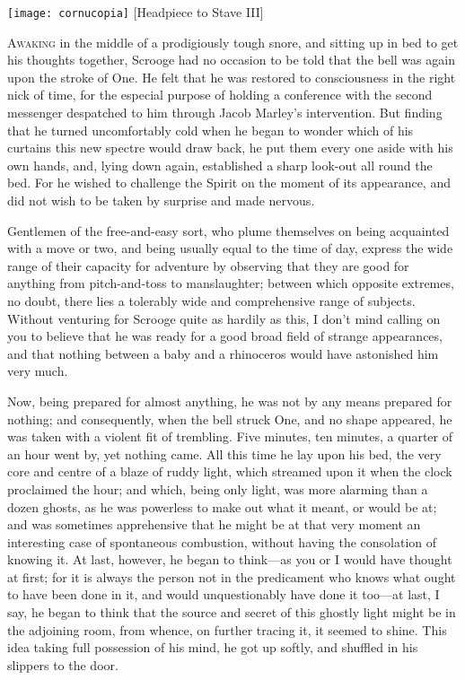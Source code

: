 \begin{minipage}[c]{\textwidth}
\texttt{[image: cornucopia]}
[Headpiece to Stave III]{}
\end{minipage}
\vfill

\lettrine[lines=4]{A}{waking} in the middle of a prodigiously tough snore, and sitting up in bed to get his thoughts together, Scrooge had no occasion to be told that the bell was again upon the stroke of One. He felt that he was restored to consciousness in the right nick of time, for the especial purpose of holding a conference with the second messenger despatched to him through Jacob Marley's intervention. But finding that he turned uncomfortably cold when he began to wonder which of his curtains this new spectre would draw back, he put them every one aside with his own hands, and, lying down again, established a sharp look-out all round the bed. For he wished to challenge the Spirit on the moment of its appearance, and did not wish to be taken by surprise and made nervous.

Gentlemen of the free-and-easy sort, who plume themselves on being acquainted with a move or two, and being usually equal to the time of day, express the wide range of their capacity for adventure by observing that they are good for anything from pitch-and-toss to manslaughter; between which opposite extremes, no doubt, there lies a tolerably wide and comprehensive range of subjects. Without venturing for Scrooge quite as hardily as this, I don't mind calling on you to believe that he was ready for a good broad field of strange appearances, and that nothing between a baby and a rhinoceros would have astonished him very much.

Now, being prepared for almost anything, he was not by any means prepared for nothing; and consequently, when the bell  struck One, and no shape appeared, he was taken with a violent fit of trembling. Five minutes, ten minutes, a quarter of an hour went by, yet nothing came. All this time he lay upon his bed, the very core and centre of a blaze of ruddy light, which streamed upon it when the clock proclaimed the hour; and which, being only light, was more alarming than a dozen ghosts, as he was powerless to make out what it meant, or would be at; and was sometimes apprehensive that he might be at that very moment an interesting case of spontaneous combustion, without having the consolation of knowing it. At last, however, he began to think---as you or I would have thought at first; for it is always the person not in the predicament who knows what ought to have been done in it, and would unquestionably have done it too---at last, I say, he began to think that the source and secret of this ghostly light might be in the adjoining room, from whence, on further tracing it, it seemed to shine. This idea taking full possession of his mind, he got up softly, and shuffled in his slippers to the door.

